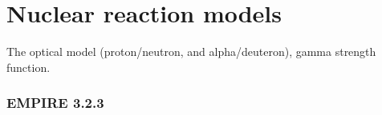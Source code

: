 \documentclass[a4paper,11pt,twoside]{book}
\begin{document}

\section{Nuclear reaction models}

The optical model (proton/neutron, and alpha/deuteron), gamma strength function. 

\subsubsection{EMPIRE 3.2.3}
\end{document}
